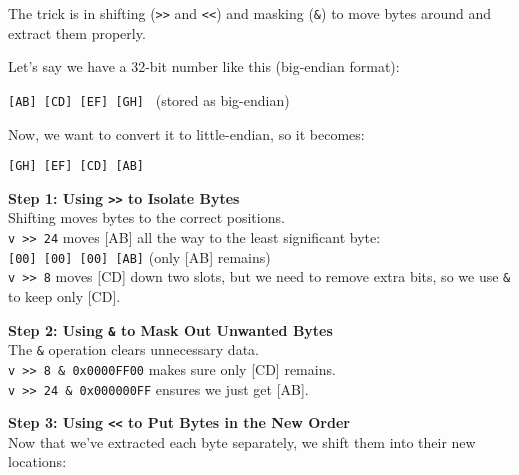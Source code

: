 \begin{NexMainBox}
	\begin{NexMainBox}[dark, crnA, title=\textbf{The Trick: Shifting and Masking}]
		The trick is in shifting (\texttt{>>} and \texttt{<<}) and masking (\texttt{\&}) to move bytes around and extract them properly.
	\end{NexMainBox}
	\begin{NexMainBox}[dark, crnA, title=\textbf{Step-by-Step: How We Flip Bytes}]
		Let's say we have a 32-bit number like this (big-endian format):

		\begin{NexMainBox}[light]
		\begin{center}
		\texttt{[AB] [CD] [EF] [GH]} \ (stored as big-endian)
		\end{center}

	\end{NexMainBox}
		Now, we want to convert it to little-endian, so it becomes:

		\begin{NexMainBox}[light]
		\begin{center}
		\texttt{[GH] [EF] [CD] [AB]}
		\end{center}

	\end{NexMainBox}
		\textbf{Step 1: Using \texttt{>>} to Isolate Bytes} \\
		Shifting moves bytes to the correct positions.\\

		\texttt{v >> 24} moves [AB] all the way to the least significant byte: \\
		\texttt{[00] [00] [00] [AB]}  (only [AB] remains)\\
		\texttt{v >> 8} moves [CD] down two slots, but we need to remove extra bits, so we use \texttt{\&} to keep only [CD].

		\textbf{Step 2: Using \texttt{\&} to Mask Out Unwanted Bytes} \\
		The \texttt{\&} operation clears unnecessary data.\\

		\texttt{v >> 8 \& 0x0000FF00} makes sure only [CD] remains.\\
		\texttt{v >> 24 \& 0x000000FF} ensures we just get [AB].

		\textbf{Step 3: Using \texttt{<<} to Put Bytes in the New Order} \\
		Now that we’ve extracted each byte separately, we shift them into their new locations:


\end{NexMainBox}
\end{NexMainBox}
